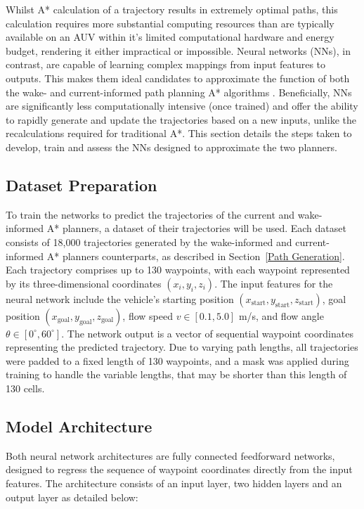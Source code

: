 \documentclass[final,5p,times,twocolumn]{elsarticle}
\begin{document}
Whilst A* calculation of a trajectory results in extremely optimal paths, this calculation requires more substantial computing resources than are typically available on an AUV within it's limited computational hardware and energy budget, rendering it either impractical or impossible. Neural networks (NNs), in contrast, are capable of learning complex mappings from input features to outputs. This makes them ideal candidates to approximate the function of both the wake- and current-informed path planning A* algorithms \cite{LeCun2015}. Beneficially, NNs are significantly less computationally intensive (once trained) and offer the ability to rapidly generate and update the trajectories based on a new inputs, unlike the recalculations required for traditional A*. This section details the steps taken to develop, train and assess the NNs designed to approximate the two planners.


\subsection{Dataset Preparation} %

To train the networks to predict the trajectories of the current and wake-informed A* planners, a dataset of their trajectories will be used. Each dataset consists of 18,000 trajectories generated by the wake-informed and current-informed A* planners counterparts, as described in Section~\ref{Path Generation}. Each trajectory comprises up to 130 waypoints, with each waypoint represented by its three-dimensional coordinates $(x_i, y_i, z_i)$. The input features for the neural network include the vehicle's starting position $(x_{\text{start}}, y_{\text{start}}, z_{\text{start}})$, goal position $(x_{\text{goal}}, y_{\text{goal}}, z_{\text{goal}})$, flow speed $v \in [0.1, 5.0]$ m/s, and flow angle $\theta \in [0^\circ, 60^\circ]$. The network output is a vector of sequential waypoint coordinates representing the predicted trajectory. Due to varying path lengths, all trajectories were padded to a fixed length of 130 waypoints, and a mask was applied during training to handle the variable lengths, that may be shorter than this length of 130 cells.

\subsection{Model Architecture} %

Both neural network architectures are fully connected feedforward networks, designed to regress the sequence of waypoint coordinates directly from the input features. The architecture consists of an input layer, two hidden layers and an output layer as detailed below:
\end{document}
